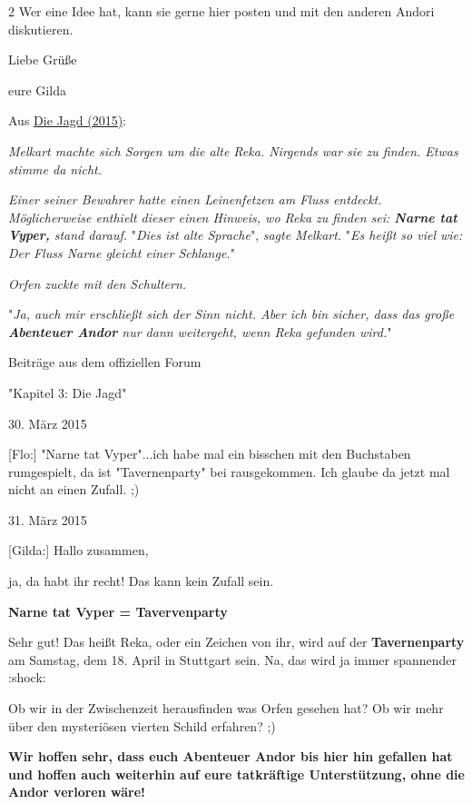\documentclass[10pt, a4paper, oneside]{book}
\begin{document}
\begin{multicols}{2}
Wer eine Idee hat, kann sie gerne hier posten und mit den anderen Andori diskutieren.


Liebe Grüße

eure Gilda

\begin{center}
    Aus \hyperref[legende-2015-die-jagd]{Die Jagd (2015)}:
\end{center}



\textit{Melkart machte sich Sorgen um die alte Reka. Nirgends war sie zu finden. Etwas stimme da nicht.}

\textit{Einer seiner Bewahrer hatte einen Leinenfetzen am Fluss entdeckt. Möglicherweise enthielt dieser einen Hinweis, wo Reka zu finden sei: \textbf{Narne tat Vyper,} stand darauf.} "\textit{Dies ist alte Sprache}", \textit{sagte Melkart.} "\textit{Es heißt so viel wie: Der Fluss Narne gleicht einer Schlange.}"

\textit{Orfen zuckte mit den Schultern.}

"\textit{Ja, auch mir erschließt sich der Sinn nicht. Aber ich bin sicher, dass das große \textbf{Abenteuer Andor} nur dann weitergeht, wenn Reka gefunden wird.}"

\begin{center}
    Beiträge aus dem offiziellen Forum

    "Kapitel 3: Die Jagd"
    
    30. März 2015
\end{center}

[Flo:] "Narne tat Vyper"...ich habe mal ein bisschen mit den Buchstaben rumgespielt, da ist "Tavernenparty" bei rausgekommen. Ich glaube da jetzt mal nicht an einen Zufall. ;)


\begin{center}
    31. März 2015
\end{center}

[Gilda:] Hallo zusammen,

ja, da habt ihr recht! Das kann kein Zufall sein.

\textbf{Narne tat Vyper = Tavervenparty}

Sehr gut! Das heißt Reka, oder ein Zeichen von ihr, wird auf der \textbf{Tavernenparty} am Samstag, dem 18. April in Stuttgart sein. Na, das wird ja immer spannender :shock:

Ob wir in der Zwischenzeit herausfinden was Orfen gesehen hat? Ob wir mehr über den mysteriösen vierten Schild erfahren? ;)

\textbf{Wir hoffen sehr, dass euch Abenteuer Andor bis hier hin gefallen hat und hoffen auch weiterhin auf eure tatkräftige Unterstützung, ohne die Andor verloren wäre!}



\end{multicols}
\end{document}
